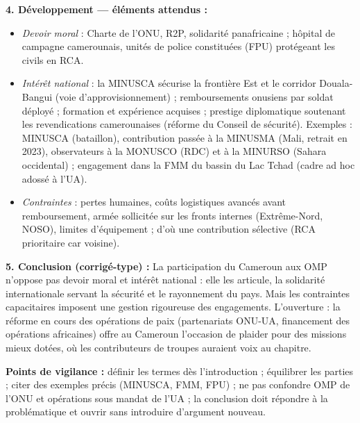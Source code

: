 \documentclass[11pt]{article}
\begin{document}
\begin{corrige}
\textbf{4. Développement — éléments attendus :}
\begin{itemize}
    \item \emph{Devoir moral} : Charte de l'ONU, R2P, solidarité panafricaine ; hôpital de campagne camerounais, unités de police constituées (FPU) protégeant les civils en RCA.
    \item \emph{Intérêt national} : la MINUSCA sécurise la frontière Est et le corridor Douala-Bangui (voie d'approvisionnement) ; remboursements onusiens par soldat déployé ; formation et expérience acquises ; prestige diplomatique soutenant les revendications camerounaises (réforme du Conseil de sécurité). Exemples : MINUSCA (bataillon), contribution passée à la MINUSMA (Mali, retrait en 2023), observateurs à la MONUSCO (RDC) et à la MINURSO (Sahara occidental) ; engagement dans la FMM du bassin du Lac Tchad (cadre ad hoc adossé à l'UA).
    \item \emph{Contraintes} : pertes humaines, coûts logistiques avancés avant remboursement, armée sollicitée sur les fronts internes (Extrême-Nord, NOSO), limites d'équipement ; d'où une contribution sélective (RCA prioritaire car voisine).
\end{itemize}

\textbf{5. Conclusion (corrigé-type) :} La participation du Cameroun aux OMP n'oppose pas devoir moral et intérêt national : elle les articule, la solidarité internationale servant la sécurité et le rayonnement du pays. Mais les contraintes capacitaires imposent une gestion rigoureuse des engagements. L'ouverture : la réforme en cours des opérations de paix (partenariats ONU-UA, financement des opérations africaines) offre au Cameroun l'occasion de plaider pour des missions mieux dotées, où les contributeurs de troupes auraient voix au chapitre.

\textbf{Points de vigilance :} définir les termes dès l'introduction ; équilibrer les parties ; citer des exemples précis (MINUSCA, FMM, FPU) ; ne pas confondre OMP de l'ONU et opérations sous mandat de l'UA ; la conclusion doit répondre à la problématique et ouvrir sans introduire d'argument nouveau.
\end{corrige}
\end{document}
